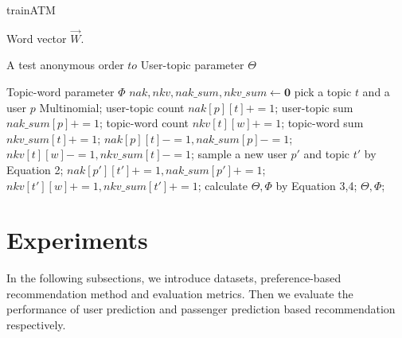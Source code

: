 \documentclass{sig-alternate-05-2015}
\begin{document}
\begin{algorithm}[htb]
\caption{trainATM}
\label{alg0}
\begin{algorithmic}[1]
\REQUIRE
Word vector $\overrightarrow{W}$. \par
A test anonymous order $to$
\ENSURE 
User-topic parameter $\Theta$ \par
Topic-word parameter $\Phi$
\STATE $nak , nkv, nak\_sum, nkv\_sum \leftarrow \mathbf{0}$
\STATE pick a topic $t$ and a user $p$ Multinomial;
\STATE user-topic count $nak[p][t] += 1$;
\STATE user-topic sum $nak\_sum[p] += 1$;
\STATE topic-word count $nkv[t][w] += 1$;
\STATE topic-word sum $nkv\_sum[t] += 1$;
\ENDFOR
\ENDFOR
{}
\STATE $nak[p][t] -= 1, nak\_sum[p] -= 1$;
\STATE $nkv[t][w] -= 1, nkv\_sum[t] -= 1$;
\STATE sample a new user $p'$ and topic $t'$ by Equation 2;
\STATE $nak[p'][t'] += 1, nak\_sum[p'] += 1$;
\STATE $nkv[t'][w] += 1, nkv\_sum[t'] += 1$;
\ENDFOR
\ENDFOR
\ENDWHILE
\STATE calculate $\Theta,\Phi$ by Equation 3,4;
\RETURN $\Theta,\Phi$;
\end{algorithmic} 
\end{algorithm}


\section{Experiments}
In the following subsections, we introduce datasets, preference-based recommendation method and evaluation metrics. Then we evaluate the performance of user prediction and passenger prediction based recommendation respectively.
\end{document}
